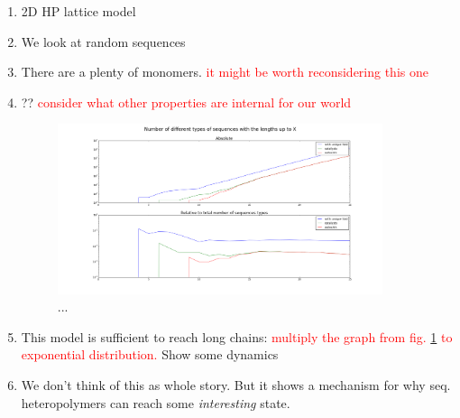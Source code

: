 \documentclass[12pt]{paper}
\newcommand{\red}[1]{\textcolor{red}{#1}}
\begin{document}
 \begin{enumerate}
   \item 2D HP lattice model
   \item We look at random sequences
   \item There are a plenty of monomers.   \red{it might be worth reconsidering this one}
   \item ??   \red{consider what other properties are internal for our world}
   \begin{figure}[h!]
     \centering
     \includegraphics[width=0.9\textwidth]{pictures/hp-statistics.png} 
     \caption{...}\label{fig:hp-stat}
   \end{figure}
   \item This model is sufficient to reach long chains: \red{multiply the graph from 
     fig. \ref{fig:hp-stat} to exponential distribution.}
   \subitem \textbullet Show some dynamics
   \item We don't think of this as whole story. 
   \subitem \textbullet But it shows a mechanism for why seq. heteropolymers can reach some 
   \textit{interesting} state.
 \end{enumerate}

 
 
\end{document}
